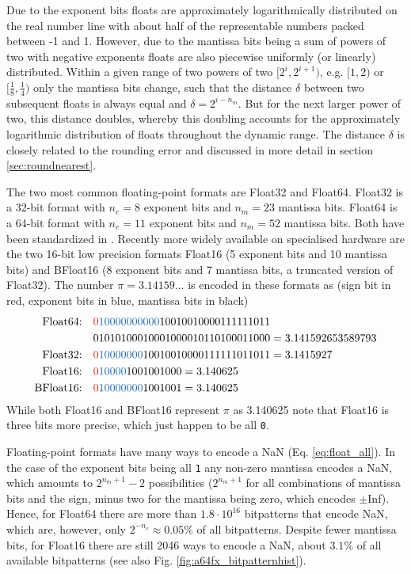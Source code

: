 Due to the exponent bits floats are approximately logarithmically distributed on the real number line with about half of the representable
numbers packed between -1 and 1. However, due to the mantissa bits being a sum of powers of two with negative exponents floats
are also piecewise uniformly (or linearly) distributed. Within a given range of two powers of two $[2^i,2^{i+1})$, e.g. $[1,2)$ or
$[\tfrac{1}{8},\tfrac{1}{4})$ only the mantissa bits change, such that the distance $\delta$ between two subsequent 
floats is always equal and $\delta = 2^{i-n_m}$. But for the next larger power of two, this distance doubles, whereby
this doubling accounts for the approximately logarithmic distribution of floats throughout the dynamic range. The distance $\delta$ is
closely related to the rounding error and discussed in more detail in section \ref{sec:roundnearest}.

The two most common floating-point formats are Float32 and Float64. Float32 is a 32-bit format with $n_e=8$ exponent bits and
$n_m=23$ mantissa bits. Float64 is a 64-bit format with $n_e=11$ exponent bits and $n_m=52$ mantissa bits. Both have been 
standardized in \cite{IEEE1985}. Recently more widely available on specialised hardware are the two 16-bit low precision formats
Float16 (5 exponent bits and 10 mantissa bits) and BFloat16 (8 exponent bits and 7 mantissa bits, a truncated version of Float32).
The number $\pi = 3.14159...$ is encoded in these formats as (sign bit in red, exponent bits in blue, mantissa bits in black)
\begin{align}
\text{Float64:}& \quad {\color{psign}0}{\color{pexpo}10000000000}10010010000111111011 \nonumber \\
			& \quad 01010100010001000010110100011000 = 3.141592653589793 \nonumber \\
\text{Float32:}& \quad {\color{psign}0}{\color{pexpo}10000000}10010010000111111011011 = 3.1415927 \nonumber \\
\text{Float16:}& \quad {\color{psign}0}{\color{pexpo}10000}1001001000 = 3.140625 \nonumber \\
\text{BFloat16:}& \quad {\color{psign}0}{\color{pexpo}10000000}1001001 = 3.140625
\end{align}
While both Float16 and BFloat16 represent $\pi$ as 3.140625 note that Float16 is three bits more precise, which just happen to be all \texttt{0}.

Floating-point formats have many ways to encode a NaN (Eq. \ref{eq:float_all}). In the case of the exponent bits being all \texttt{1} any non-zero
mantissa encodes a NaN, which amounts to $2^{n_m+1}-2$ possibilities ($2^{n_m+1}$ for all combinations of mantissa bits and the sign,
minus two for the mantissa being zero, which encodes $\pm$Inf). Hence, for Float64 there are more than $1.8 \cdot 10^{16}$ bitpatterns
that encode NaN, which are, however, only $2^{-n_e} \approx 0.05\%$ of all bitpatterns. Despite fewer mantissa bits, for Float16 there are
still 2046 ways to encode a NaN, about $3.1\%$ of all available bitpatterns (see also Fig. \ref{fig:a64fx_bitpatternhist}).

